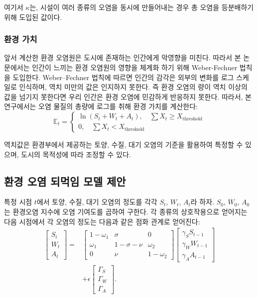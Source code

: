 \documentclass[10pt]{article}
\begin{document}
\begin{multicols}{2}
여기서 $\kappa$는, 시설이 여러 종류의 오염을 동시에 만들어내는 경우 총 오염을 등분배하기 위해 도입된 값이다.

\subsubsection{환경 가치}
앞서 계산한 환경 오염원은 도시에 존재하는 인간에게 악영향을 미친다. 따라서 본 논문에서는 인간이 느끼는 환경 오염원의 영향을 체계화 하기 위해 Weber-Fechner 법칙을 도입한다. Weber–Fechner 법칙에 따르면 인간의 감각은 외부의 변화를 로그 스케일로 인식하며, 역치 미만의 값은 인지하지 못한다. 즉 환경 오염의 량이 역치 이상의 값을 넘기지 못한다면 우리 인간은 환경 오염에 민감하게 반응하지 못한다. 따라서, 본 연구에서는 오염 물질의 총량에 로그를 취해 환경 가치를 계산한다:
\begin{equation}
 \mathbb{E}_t =
 \begin{cases}
 \ln (S_t + W_t + A_t), \quad \sum X_t \ge X_\text{threshold}\\
 0, \quad \sum X_t < X_\text{threshold}
 \end{cases}
\end{equation}

역치값은 환경부에서 제공하는 토양, 수질, 대기 오염의 기준을 활용하여 특정할 수 있으며, 도시의 목적성에 따라 조정할 수 있다. 
\subsection{환경 오염 되먹임 모델 제안}
 특정 시점 $t$에서 토양, 수질, 대기 오염의 정도를 각각 $S_t$, $W_t$, $A_t$라 하자. $S_0$, $W_0$, $A_0$는 환경오염 지수에 오염 기여도를 곱하여 구한다. 각 종류의 상호작용으로 얻어지는 다음 시점에서 각 오염의 정도는 다음과 같은 점화 관계로 얻어진다:
\begin{equation}
 \begin{aligned}
 \begin{bmatrix}
 S_t\\
 W_t\\
 A_t
 \end{bmatrix}
 =
 &\begin{bmatrix}
 1 - \omega_1 & \sigma & 0\\
 \omega_1 & 1 - \sigma - \nu & \omega_2\\
 0 & \nu & 1 - \omega_2
 \end{bmatrix}
 \begin{bmatrix}
 \gamma_S S_{t - 1}\\
 \gamma_W W_{t - 1}\\
 \gamma_A A_{t - 1}
 \end{bmatrix}\\
 &+
 \epsilon
 \begin{bmatrix}
 \Gamma_S\\
 \Gamma_W\\
 \Gamma_A
 \end{bmatrix}.
 \end{aligned}
 \end{equation}


\end{multicols}
\end{document}
